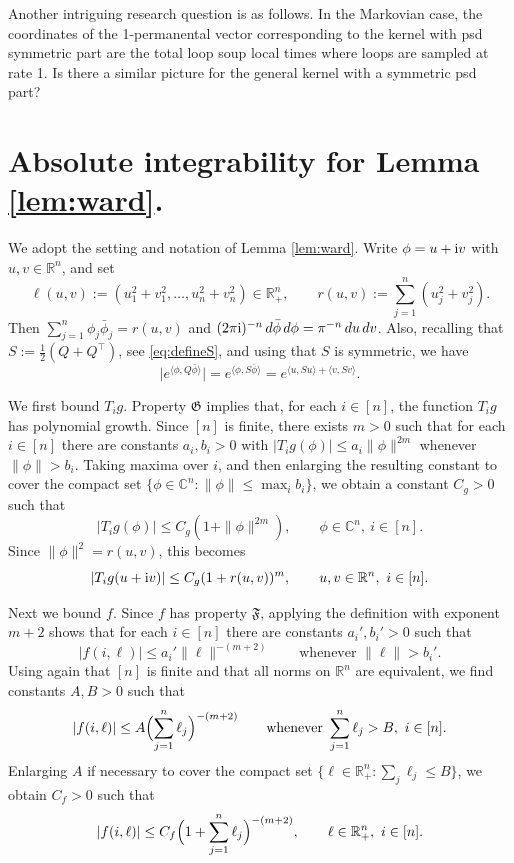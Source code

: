 \documentclass[a4paper, 11pt]{article}
\newcommand{\compi}{\textnormal{i}}
\begin{document}
Another intriguing research question is as follows. In the Markovian case, the coordinates of the 1-permanental vector corresponding to the kernel with psd symmetric part are the total loop soup local times where loops are sampled at rate 1. Is there a similar picture for the general kernel with
a symmetric psd part?

\appendix
\section{Absolute integrability for Lemma \ref{lem:ward}.}
\label{apx:sec1}

We adopt the setting and notation of Lemma \ref{lem:ward}. Write \(\phi=u+\compi v\) with \(u,v\in\mathbb{R}^n\), and set
\[
\ell(u,v):=(u_1^2+v_1^2,\dots,u_n^2+v_n^2)\in\mathbb{R}_+^n,
\qquad
r(u,v):=\sum_{j=1}^n (u_j^2+v_j^2).
\]
Then \(\sum_{j=1}^n \phi_j\bar{\phi}_j=r(u,v)\) and \((2\pi\compi)^{-n}\,d\bar{\phi}\,d\phi=\pi^{-n}\,du\,dv\). Also, recalling that \(S:=\frac12(Q+Q^\top)\), see \eqref{eq:defineS}, and using that \(S\) is symmetric, we have
\[
\bigl|e^{\langle \phi,Q\bar{\phi}\rangle}\bigr|
= e^{\langle \phi,S\bar{\phi}\rangle} = e^{\langle u,Su\rangle+\langle v,Sv\rangle}.
\]

We first bound \(T_i g\). Property \(\mathfrak{G}\) implies that, for each \(i\in[n]\), the function \(T_i g\) has polynomial growth. Since \([n]\) is finite, there exists \(m>0\) such that for each \(i\in[n]\) there are constants \(a_i,b_i>0\) with \(|T_i g(\phi)|\le a_i\|\phi\|^{2m}\) whenever \(\|\phi\|>b_i\). Taking maxima over \(i\), and then enlarging the resulting constant to cover the compact set \(\{\phi\in\mathbb{C}^n:\|\phi\|\le \max_i b_i\}\), we obtain a constant \(C_g>0\) such that
\[
|T_i g(\phi)|\le C_g(1+\|\phi\|^{2m}),
\qquad \phi\in\mathbb{C}^n,\ i\in[n].
\]
Since \(\|\phi\|^2=r(u,v)\), this becomes
\[
|T_i g(u+\compi v)|\le C_g(1+r(u,v))^m,
\qquad u,v\in\mathbb{R}^n,\ i\in[n].
\]

Next we bound \(f\). Since \(f\) has property \(\mathfrak{F}\), applying the definition with exponent \(m+2\) shows that for each \(i\in[n]\) there are constants \(a_i',b_i'>0\) such that
\[
|f(i,\ell)|\le a_i'\|\ell\|^{-(m+2)}
\qquad\text{whenever }\|\ell\|>b_i'.
\]
Using again that \([n]\) is finite and that all norms on \(\mathbb{R}^n\) are equivalent, we find constants \(A,B>0\) such that
\[
|f(i,\ell)|\le A\Bigl(\sum_{j=1}^n \ell_j\Bigr)^{-(m+2)}
\qquad\text{whenever }\sum_{j=1}^n \ell_j>B,\ i\in[n].
\]
Enlarging \(A\) if necessary to cover the compact set \(\{\ell\in\mathbb{R}_+^n:\sum_j\ell_j\le B\}\), we obtain \(C_f>0\) such that
\[
|f(i,\ell)|\le C_f\Bigl(1+\sum_{j=1}^n \ell_j\Bigr)^{-(m+2)},
\qquad \ell\in\mathbb{R}_+^n,\ i\in[n].
\]
\end{document}

